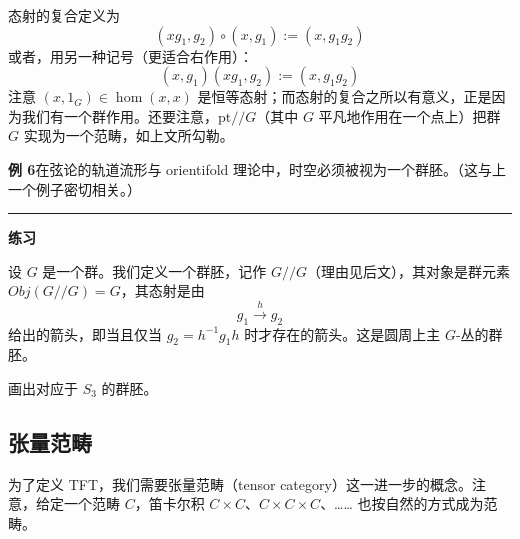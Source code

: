 态射的复合定义为
\begin{equation}
  (xg_1,g_2)\circ(x,g_1):=(x,g_1g_2)
  \tag{K.42}
  \label{eq:K.42}
\end{equation}
或者，用另一种记号（更适合右作用）：
\begin{equation}
  (x,g_1)(xg_1,g_2):=(x,g_1g_2)
  \tag{K.43}
  \label{eq:K.43}
\end{equation}
注意 $(x,1_G)\in\hom(x,x)$ 是恒等态射；而态射的复合之所以有意义，正是因为我们有一个群作用。还要注意，$\mathrm{pt}/\!/G$（其中 $G$ 平凡地作用在一个点上）把群 $G$ 实现为一个范畴，如上文所勾勒。



\textbf{例 6}\quad 在弦论的轨道流形与 orientifold 理论中，时空必须被视为一个群胚。（这与上一个例子密切相关。）

\medskip
\noindent\rule{\linewidth}{0.4pt}
\medskip
\noindent\textbf{练习}

设 $G$ 是一个群。我们定义一个群胚，记作 $G/\!/G$（理由见后文），其对象是群元素 $\mathit{Obj}(G/\!/G)=G$，其态射是由
\begin{equation}
  g_1\xrightarrow{\ h\ }g_2
  \tag{K.44}
  \label{eq:K.44}
\end{equation}
给出的箭头，即当且仅当 $g_2=h^{-1}g_1h$ 时才存在的箭头。这是圆周上主 $G$-丛的群胚。

画出对应于 $S_3$ 的群胚。

\subsection{张量范畴} %

为了定义 TFT，我们需要张量范畴（tensor category）这一进一步的概念。注意，给定一个范畴 $C$，笛卡尔积 $C\times C$、$C\times C\times C$、…… 也按自然的方式成为范畴。

